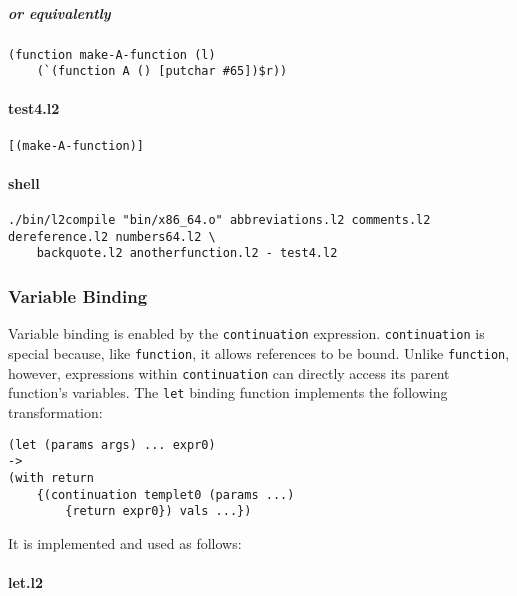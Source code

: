 \documentclass[]{article}
\let\oldparagraph\paragraph
\renewcommand{\paragraph}[1]{\oldparagraph{#1}\mbox{}}
\let\oldsubparagraph\subparagraph
\renewcommand{\subparagraph}[1]{\oldsubparagraph{#1}\mbox{}}
\begin{document}
\hypertarget{or-equivalently-2}{%
\subparagraph{or equivalently}\label{or-equivalently-2}}

\begin{verbatim}
(function make-A-function (l)
    (`(function A () [putchar #65])$r))
\end{verbatim}

\hypertarget{test4.l2}{%
\paragraph{test4.l2}\label{test4.l2}}

\begin{verbatim}
[(make-A-function)]
\end{verbatim}

\hypertarget{shell-3}{%
\paragraph{shell}\label{shell-3}}

\begin{verbatim}
./bin/l2compile "bin/x86_64.o" abbreviations.l2 comments.l2 dereference.l2 numbers64.l2 \
    backquote.l2 anotherfunction.l2 - test4.l2
\end{verbatim}

\hypertarget{variable-binding}{%
\subsubsection{Variable Binding}\label{variable-binding}}

Variable binding is enabled by the \texttt{continuation} expression.
\texttt{continuation} is special because, like \texttt{function}, it
allows references to be bound. Unlike \texttt{function}, however,
expressions within \texttt{continuation} can directly access its parent
function's variables. The \texttt{let} binding function implements the
following transformation:

\begin{verbatim}
(let (params args) ... expr0)
->
(with return
    {(continuation templet0 (params ...)
        {return expr0}) vals ...})
\end{verbatim}

It is implemented and used as follows:

\hypertarget{let.l2}{%
\paragraph{let.l2}\label{let.l2}}
\end{document}
